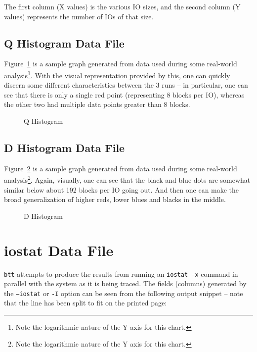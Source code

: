 \documentclass{article}
\begin{document}
  The first column (X values) is the various IO sizes, and the second
  column (Y values) represents the number of IOs of that size.

\subsection{\label{sec:qhist}Q Histogram Data File}

  Figure~\ref{fig:qhist} is a sample graph generated from data used during
  some real-world analysis\footnote{Note the logarithmic nature of the
  Y axis for this chart.}. With the visual representation provided by
  this, one can quickly discern some different characteristics between
  the 3 runs -- in particular, one can see that there is only a single
  red point (representing 8 blocks per IO), whereas the other two had
  multiple data points greater than 8 blocks.

  \begin{figure}[hb]
  \leavevmode\centering
  \caption{\label{fig:qhist}Q Histogram}
  \end{figure}

\subsection{\label{sec:dhist}D Histogram Data File}

  Figure~\ref{fig:dhist} is a sample graph generated from data used during
  some real-world analysis\footnote{Note the logarithmic nature of the
  Y axis for this chart.}. Again, visually, one can see that the black
  and blue dots are somewhat similar below about 192 blocks per IO going
  out. And then one can make the broad generalization of higher reds,
  lower blues and blacks in the middle.

  \begin{figure}[hb]
  \leavevmode\centering
  \caption{\label{fig:dhist}D Histogram}
  \end{figure}

\newpage\section{\label{sec:iostat}iostat Data File}
  \texttt{btt} attempts to produce the results from running an
  \texttt{iostat -x} command in parallel with the system as it is being
  traced. The fields (columns) generated by the \texttt{--iostat} or
  \texttt{-I} option can be seen from the following output snippet --
  note that the line has been split to fit on the printed page:
\end{document}
